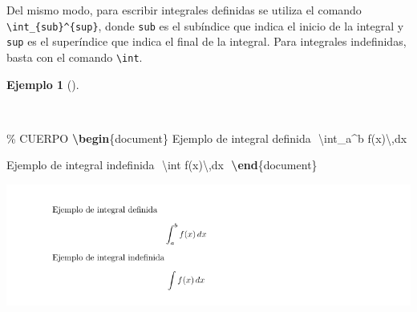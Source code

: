 \documentclass[
  a4paper,
]{scrreport}
\newenvironment{Shaded}{\begin{snugshade}}{\end{snugshade}}
\newcommand{\CommentTok}[1]{\textcolor[rgb]{0.37,0.37,0.37}{#1}}
\newcommand{\ExtensionTok}[1]{\textcolor[rgb]{0.00,0.23,0.31}{#1}}
\newcommand{\KeywordTok}[1]{\textcolor[rgb]{0.00,0.23,0.31}{\textbf{#1}}}
\newcommand{\NormalTok}[1]{\textcolor[rgb]{0.00,0.23,0.31}{#1}}
\newcommand{\SpecialCharTok}[1]{\textcolor[rgb]{0.37,0.37,0.37}{#1}}
\newcommand{\SpecialStringTok}[1]{\textcolor[rgb]{0.13,0.47,0.30}{#1}}
\theoremstyle{definition}
\newtheorem{example}{Ejemplo}[chapter]
\theoremstyle{remark}
\begin{document}
Del mismo modo, para escribir integrales definidas se utiliza el comando
\texttt{\textbackslash{}int\_\{sub\}\^{}\{sup\}}, donde \texttt{sub} es
el subíndice que indica el inicio de la integral y \texttt{sup} es el
superíndice que indica el final de la integral. Para integrales
indefinidas, basta con el comando \texttt{\textbackslash{}int}.

\begin{example}[]\protect\hypertarget{exm-integrales}{}\label{exm-integrales}

~

\begin{Shaded}
\begin{Highlighting}[]
\CommentTok{\% CUERPO}
\KeywordTok{\textbackslash{}begin}\NormalTok{\{}\ExtensionTok{document}\NormalTok{\}}
\NormalTok{Ejemplo de integral definida}
\SpecialStringTok{$$}
\SpecialCharTok{\textbackslash{}int}\SpecialStringTok{\_a\^{}b f(x)}\SpecialCharTok{\textbackslash{},}\SpecialStringTok{dx}
\SpecialStringTok{$$}

\NormalTok{Ejemplo de integral indefinida}
\SpecialStringTok{$$}
\SpecialCharTok{\textbackslash{}int}\SpecialStringTok{ f(x)}\SpecialCharTok{\textbackslash{},}\SpecialStringTok{dx}
\SpecialStringTok{$$}
\KeywordTok{\textbackslash{}end}\NormalTok{\{}\ExtensionTok{document}\NormalTok{\}}
\end{Highlighting}
\end{Shaded}

\begin{tcolorbox}[enhanced jigsaw, colframe=quarto-callout-note-color-frame, opacityback=0, title={Salida}, bottomrule=.15mm, left=2mm, coltitle=black, arc=.35mm, leftrule=.75mm, colback=white, rightrule=.15mm, colbacktitle=quarto-callout-note-color!10!white, toprule=.15mm, breakable, opacitybacktitle=0.6, bottomtitle=1mm, toptitle=1mm, titlerule=0mm]

\includegraphics{img/formulas/integral.png}

\end{tcolorbox}

\end{example}
\end{document}
